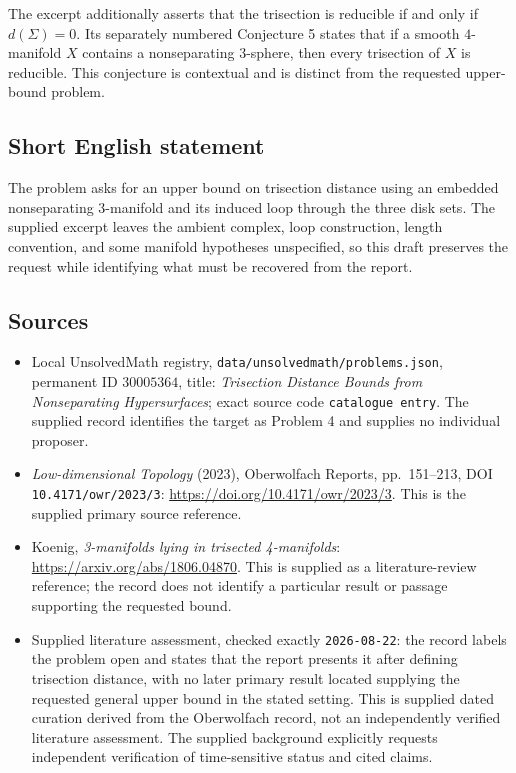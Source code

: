 \documentclass[11pt]{article}
\begin{document}
The excerpt additionally asserts that the trisection is reducible if and only if \(d(\Sigma)=0\). Its separately numbered Conjecture 5 states that if a smooth \(4\)-manifold \(X\) contains a nonseparating \(3\)-sphere, then every trisection of \(X\) is reducible. This conjecture is contextual and is distinct from the requested upper-bound problem.
\subsection{Short English statement}
The problem asks for an upper bound on trisection distance using an embedded nonseparating \(3\)-manifold and its induced loop through the three disk sets. The supplied excerpt leaves the ambient complex, loop construction, length convention, and some manifold hypotheses unspecified, so this draft preserves the request while identifying what must be recovered from the report.
\subsection{Sources}
\begin{itemize}
\item Local UnsolvedMath registry, \texttt{data/unsolvedmath/problems.json}, permanent ID \(30005364\), title: \emph{Trisection Distance Bounds from Nonseparating Hypersurfaces}; exact source code \texttt{catalogue entry}. The supplied record identifies the target as Problem 4 and supplies no individual proposer.
\item \emph{Low-dimensional Topology} (2023), Oberwolfach Reports, pp.\ 151--213, DOI \texttt{10.4171/owr/2023/3}: \url{https://doi.org/10.4171/owr/2023/3}. This is the supplied primary source reference.
\item Koenig, \emph{3-manifolds lying in trisected 4-manifolds}: \url{https://arxiv.org/abs/1806.04870}. This is supplied as a literature-review reference; the record does not identify a particular result or passage supporting the requested bound.
\item Supplied literature assessment, checked exactly \texttt{2026-08-22}: the record labels the problem open and states that the report presents it after defining trisection distance, with no later primary result located supplying the requested general upper bound in the stated setting. This is supplied dated curation derived from the Oberwolfach record, not an independently verified literature assessment. The supplied background explicitly requests independent verification of time-sensitive status and cited claims.
\end{itemize}
\end{document}
